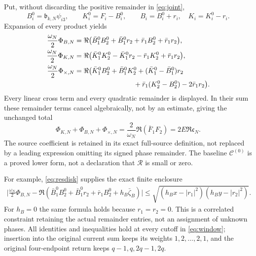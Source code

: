 \documentclass[11pt]{article}
\begin{document}
Put, without discarding the positive remainder in \eqref{eq:joint},
\[
 B_i^0=\mathfrak b_{k,N}\psi_{i3},\qquad
 K_i^0=F_i-B_i^0,\qquad B_i=B_i^0+r_i,\quad K_i=K_i^0-r_i.
\]
Expansion of every product yields
\begin{equation}\label{eq:currentremainders}
 \begin{aligned}
 \frac{\omega_N}2\Phi_{B,N}
 &=\Re\bigl(\bar B_1^0B_2^0+\bar B_1^0r_2
              +\bar r_1B_2^0+\bar r_1r_2\bigr),\\
 \frac{\omega_N}2\Phi_{K,N}
 &=\Re\bigl(\bar K_1^0K_2^0-\bar K_1^0r_2
              -\bar r_1K_2^0+\bar r_1r_2\bigr),\\
 \frac{\omega_N}2\Phi_{\times,N}
 &=\Re\bigl(\bar K_1^0B_2^0+\bar B_1^0K_2^0
       +(\bar K_1^0-\bar B_1^0)r_2\\
 &\hspace{30mm}+\bar r_1(K_2^0-B_2^0)-2\bar r_1r_2\bigr).
 \end{aligned}
\end{equation}
Every linear cross term and every quadratic remainder is displayed.
In their sum these remainder terms cancel algebraically, not by an
estimate, giving the unchanged total
\begin{equation}\label{eq:currenttotal}
 \Phi_{K,N}+\Phi_{B,N}+\Phi_{\times,N}
 =\frac2{\omega_N}\Re(\bar F_1F_2)
 =2E\Re\mathfrak c_N.
\end{equation}
The source coefficient is retained in its exact full-source definition,
not replaced by a leading expression omitting its signed phase remainder.
The baseline $\mathcal C^{(0)}$ is a proved lower form, not a declaration
that $\mathcal R$ is small or zero.

For example, \eqref{eq:resdisk} supplies the exact finite enclosure
\begin{equation}\label{eq:currentdisk}
 \begin{split}
 \Big|\frac{\omega_N}2\Phi_{B,N}
 -\Re(\bar B_1^0B_2^0+\bar B_1^0r_2+\bar r_1B_2^0
                   +h_B\bar\zeta_B)\Big|
 \le\sqrt{(h_Bx-|r_1|^2)(h_By-|r_2|^2)}.
 \end{split}
\end{equation}
For $h_B=0$ the same formula holds because $r_1=r_2=0$.
This is a correlated constraint retaining the actual remainder entries,
not an assignment of unknown phases.  All identities and inequalities
hold at every cutoff in \eqref{eq:window}; insertion into the original
current sum keeps its weights $1,2,\ldots,2,1$, and the original
four-endpoint return keeps $q-1,q,2q-1,2q$.
\end{document}
